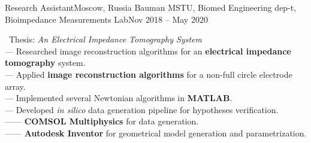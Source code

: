 \resumeSubheading
{Research Assistant}{Moscow, Russia}
{Bauman MSTU, Biomed Engineering dep-t, Bioimpedance Measurements Lab}{Nov 2018 -- May 2020}
\begin{itemize}[leftmargin=0in, label={}]
    \small{\item{
        {\textbullet \ Thesis: \textit{An Electrical Impedance Tomography System}}\\
        {— Researched image reconstruction algorithms for an \textbf{electrical impedance tomography} system.}\\
        {— Applied \textbf{image reconstruction algorithms} for a non-full circle electrode array.}\\
        {— Implemented several Newtonian algorithms in \textbf{MATLAB}.}\\
        {— Developed \textit{in silico} data generation pipeline for hypotheses verification.}\\
        {—— \textbf{COMSOL Multiphysics} for data generation.}\\
        {—— \textbf{Autodesk Inventor} for geometrical model generation and parametrization.}
    }}
\end{itemize}